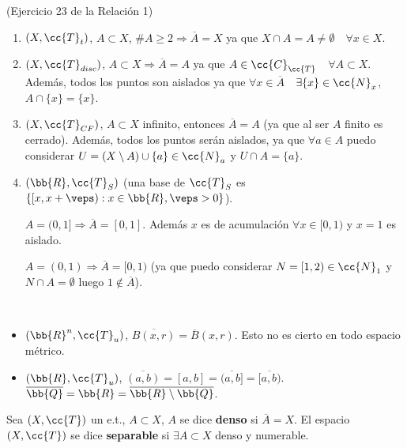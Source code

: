 \begin{ejemplo}(Ejercicio 23 de la Relación 1)
    \begin{enumerate}[label=\alph*)]
        \item $(X, \cc{T}_t)$, $A\subset X$, $\#A \geq 2 \Rightarrow \overline{A} = X$ ya que $X\cap A = A \neq \emptyset$\ \ $\forall x \in X$.
        \item $(X, \cc{T}_{disc})$, $A\subset X \Rightarrow \overline{A} = A$ ya que $A\in \cc{C}_{\cc{T}}$\ \ $\forall A \subset X$. Además, todos los puntos son aislados ya que $\forall x \in \overline{A}$\ \ $\exists \{x\}\in \cc{N}_x$, $A\cap \{x\} = \{x\}$.
        \item $(X, \cc{T}_{CF})$, $A\subset X$ infinito, entonces $\overline{A} = A$ (ya que al ser $A$ finito es cerrado). Además, todos los puntos serán aislados, ya que $\forall a \in A $ puedo considerar $U=(X\setminus A)\cup \{a\}\in \cc{N}_a$ y $U\cap A = \{a\}$.
        \item $(\bb{R}, \cc{T}_S)$ (una base de $\cc{T}_S$ es $\{[x, x+\veps ) : x \in \bb{R}, \veps>0\}$).
        
        $A=(0,1] \Rightarrow \overline{A} = [0,1]$. Además $x$ es de acumulación $\forall x \in[0,1)$ y $x=1$ es aislado.

        $A=(0,1) \Rightarrow \overline{A} = [0,1)$ (ya que puedo considerar $N=[1,2)\in \cc{N}_1$ y $N\cap A = \emptyset$ luego $1\notin \overline{A}$).
    \end{enumerate}
\end{ejemplo}

\begin{ejemplo}\
    \begin{itemize}
        \item $(\bb{R}^n , \cc{T}_u)$, $\overline{B(x,r)} = \overline{B}(x,r)$. Esto no es cierto en todo espacio métrico.
        \item $(\bb{R}, \cc{T}_u)$, $\overline{(a,b)} = [a,b] = \overline{(a,b]} = \overline{[a,b)}$. $\overline{\bb{Q}} = \bb{R} = \overline{\bb{R}\setminus \bb{Q}}$.
    \end{itemize}
    \endsquare
\end{ejemplo}

\begin{definicion}
    Sea $(X, \cc{T})$ un e.t., $A\subset X$, $A$ se dice \textbf{denso} si $\overline{A} = X$. El espacio $(X,\cc{T})$ se dice \textbf{separable} si $\exists A \subset X$ denso y numerable.
    \endsquare
\end{definicion}

